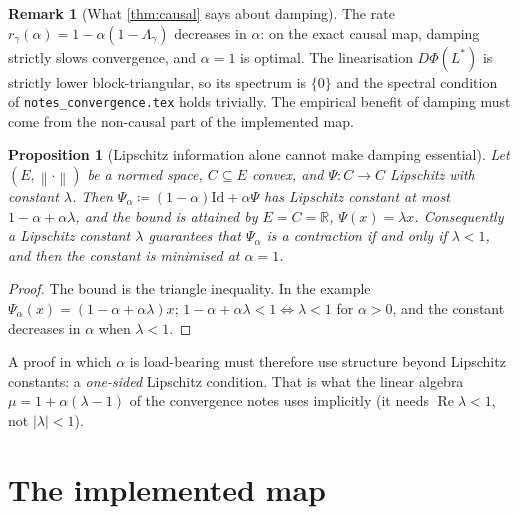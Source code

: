\documentclass[11pt,a4paper]{article}
\theoremstyle{plain}
\newtheorem{proposition}[theorem]{Proposition}
\theoremstyle{definition}
\theoremstyle{definition}
\newtheorem{remark}[theorem]{Remark}
\newcommand{\R}{\mathbb{R}}
\newcommand{\norm}[1]{\left\lVert #1 \right\rVert}
\newcommand{\abs}[1]{\left\lvert #1 \right\rvert}
\newcommand{\Lev}{L}
\newcommand{\Phimap}{\Phi}
\newcommand{\Psimap}{\Psi}
\newcommand{\Psal}{\Psi_\alpha}
\newcommand{\Id}{\mathrm{Id}}
\renewcommand{\Re}{\operatorname{Re}}
\begin{document}
\begin{remark}[What \cref{thm:causal} says about damping]\label{rem:nodamp}
The rate $r_\gamma(\alpha) = 1 - \alpha(1 - \Lambda_\gamma)$ decreases in $\alpha$: on the exact causal map, damping strictly slows convergence, and $\alpha = 1$ is optimal. The linearisation $D\Phimap(\Lev^*)$ is strictly lower block-triangular, so its spectrum is $\{0\}$ and the spectral condition of \texttt{notes\_convergence.tex} holds trivially. The empirical benefit of damping must come from the non-causal part of the implemented map.
\end{remark}

\begin{proposition}[Lipschitz information alone cannot make damping essential]\label{prop:nogo}
Let $(E, \norm{\cdot})$ be a normed space, $C \subseteq E$ convex, and $\Psimap \colon C \to C$ Lipschitz with constant $\lambda$. Then $\Psal \coloneqq (1-\alpha)\Id + \alpha \Psimap$ has Lipschitz constant at most $1 - \alpha + \alpha\lambda$, and the bound is attained by $E = C = \R$, $\Psimap(x) = \lambda x$. Consequently a Lipschitz constant $\lambda$ guarantees that $\Psal$ is a contraction if and only if $\lambda < 1$, and then the constant is minimised at $\alpha = 1$.
\end{proposition}

\begin{proof}
The bound is the triangle inequality. In the example $\Psal(x) = (1 - \alpha + \alpha\lambda)x$; $1 - \alpha + \alpha\lambda < 1 \iff \lambda < 1$ for $\alpha > 0$, and the constant decreases in $\alpha$ when $\lambda < 1$.
\end{proof}

A proof in which $\alpha$ is load-bearing must therefore use structure beyond Lipschitz constants: a \emph{one-sided} Lipschitz condition. That is what the linear algebra $\mu = 1 + \alpha(\lambda - 1)$ of the convergence notes uses implicitly (it needs $\Re \lambda < 1$, not $\abs{\lambda} < 1$).

\section{The implemented map}\label{sec:implemented}
\end{document}
